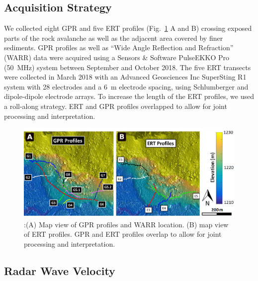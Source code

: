\documentclass[utf8]{frontiersSCNS}
\begin{document}
\subsection{Acquisition Strategy}



We collected eight GPR and five ERT profiles (Fig.~\ref{GPR_ERT_Map} A and B) crossing exposed parts of the rock avalanche as well as the adjacent area covered by finer sediments. GPR profiles as well as ``Wide Angle Reflection and Refraction'' (WARR) data were acquired using a Sensors \& Software PulseEKKO Pro (\SI{50}{\mega Hz}) system between September and October 2018. The five ERT transects were collected in March 2018 with an Advanced Geosciences Inc SuperSting R1 system with 28 electrodes and a \SI{6}{m} electrode spacing, using Schlumberger and dipole-dipole electrode arrays. To increase the length of the ERT profiles, we used a roll-along strategy. ERT and GPR profiles overlapped to allow for joint processing and interpretation. 




								 \begin{figure}

	\includegraphics[width=\textwidth]{Figures/GPR_ERT_Map.pdf}
		\caption{:(A) Map view of GPR profiles and WARR location. (B) map view of ERT profiles. GPR and ERT profiles overlap to allow for joint processing and interpretation.  \label{GPR_ERT_Map}}
		
								   \end{figure}






\subsection{Radar Wave Velocity}\label{GPRvel}
\end{document}
